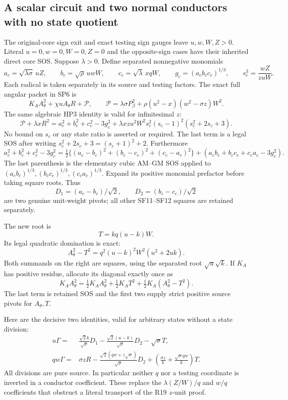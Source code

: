 \subsection{A scalar circuit and two normal conductors with no state quotient}

The original-core sign exit and exact testing sign gauges leave
$u,w,W,Z>0$. Literal $u=0,w=0,W=0,Z=0$ and the opposite-sign
cases have their inherited direct core SOS. Suppose $\lambda>0$.
Define separated nonnegative monomials
\[
 a_c=\sqrt{\lambda\sigma}\,uZ,\qquad
 b_c=\sqrt\rho\,uwW,\qquad
 c_c=\sqrt\lambda\,xqW,\qquad
 g_c=(a_cb_cc_c)^{1/3},\qquad
 s_c^3=\frac{wZ}{zuW}.
 \tag{SF10}
\]
Each radical is taken separately in its source and testing factors.
The exact full angular packet in SP6 is
\[
 K_AA_\theta^2+\chi uA_\theta R+\mathscr P,
 \qquad
 \mathscr P=\lambda\sigma P_\beta^2
       +\rho(u^2-x)(w^2-\sigma z)W^2.
\]
The same algebraic HP3 identity is valid for infinitesimal $z$:
\[
 \mathscr P+\lambda xR^2
 =a_c^2+b_c^2+c_c^2-3g_c^2
   +\lambda xzu^2W^2s_c^2(s_c-1)^2(s_c^2+2s_c+3).
 \tag{SF11}
\]
No bound on $s_c$ or any state ratio is asserted or required. The last
term is a legal SOS after writing $s_c^2+2s_c+3=(s_c+1)^2+2$.
Furthermore
\[
 a_c^2+b_c^2+c_c^2-3g_c^2
 =\tfrac12\{(a_c-b_c)^2+(b_c-c_c)^2+(c_c-a_c)^2\}
      +(a_cb_c+b_cc_c+c_ca_c-3g_c^2).
 \tag{SF12}
\]
The last parenthesis is the elementary cubic AM--GM SOS applied to
$(a_cb_c)^{1/3},(b_cc_c)^{1/3},(c_ca_c)^{1/3}$. Expand its
positive monomial prefactor before taking square roots. Thus
\[
 D_1=(a_c-b_c)/\sqrt2,\qquad
 D_2=(b_c-c_c)/\sqrt2
\]
are two genuine unit-weight pivots; all other SF11--SF12 squares
are retained separately.

The new root is
\[
 T=kq(u-k)W.
\]
Its legal quadratic domination is exact:
\[
 A_\theta^2-T^2=q^2(u-k)^2W^2(u^2+2uk).
 \tag{SF13}
\]
Both summands on the right are squares, using the separated root
$\sqrt u\sqrt k$. If $K_A$ has positive residue, allocate its
diagonal exactly once as
\[
 K_AA_\theta^2=\tfrac12K_AA_\theta^2+\tfrac12K_AT^2
                        +\tfrac12K_A(A_\theta^2-T^2).
 \tag{SF14}
\]
The last term is retained SOS and the first two supply strict
positive source pivots for $A_\theta,T$.

Here are the decisive two identities, valid for arbitrary states
without a state division:
\[
 \boxed{\begin{aligned}
 u\Gamma={}&\frac{\sqrt2 k}{\sqrt\rho}D_1
       -\frac{\sqrt2(u-k)}{\sqrt\rho}D_2-\sqrt\sigma T,\\
 qw\Gamma={}&\sigma zR
       -\frac{\sqrt2(qw+z\sqrt\sigma)}{\sqrt\rho}D_2
       +\left(\frac{\sigma z}{k}
                  +\frac{\sqrt\sigma qw}{k}\right)T.
 \end{aligned}}
 \tag{SF15}
\]
All divisions are pure source. In particular neither $q$ nor a
testing coordinate is inverted in a conductor coefficient. These
replace the $\lambda(Z/W)/q$ and $w/q$ coefficients that obstruct a
literal transport of the R19 $z$-unit proof.

